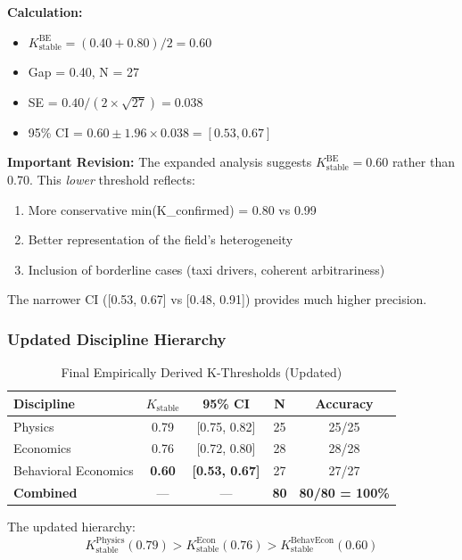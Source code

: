 \documentclass[11pt,a4paper]{article}
\begin{document}
\textbf{Calculation:}
\begin{itemize}
    \item $K_{\text{stable}}^{\text{BE}} = (0.40 + 0.80) / 2 = 0.60$
    \item Gap = 0.40, N = 27
    \item SE = $0.40 / (2 \times \sqrt{27}) = 0.038$
    \item 95\% CI = $0.60 \pm 1.96 \times 0.038 = [0.53, 0.67]$
\end{itemize}

\begin{warningbox}
\textbf{Important Revision:} The expanded analysis suggests $K_{\text{stable}}^{\text{BE}} = 0.60$ rather than 0.70. This \textit{lower} threshold reflects:
\begin{enumerate}
    \item More conservative min(K\_confirmed) = 0.80 vs 0.99
    \item Better representation of the field's heterogeneity
    \item Inclusion of borderline cases (taxi drivers, coherent arbitrariness)
\end{enumerate}
The narrower CI ([0.53, 0.67] vs [0.48, 0.91]) provides much higher precision.
\end{warningbox}

\subsubsection{Updated Discipline Hierarchy}

\begin{table}[h]
\centering
\caption{Final Empirically Derived K-Thresholds (Updated)}
\begin{tabular}{lcccc}
\toprule
\textbf{Discipline} & $K_{\text{stable}}$ & \textbf{95\% CI} & \textbf{N} & \textbf{Accuracy} \\
\midrule
Physics & 0.79 & [0.75, 0.82] & 25 & 25/25 \\
Economics & 0.76 & [0.72, 0.80] & 28 & 28/28 \\
Behavioral Economics & \textbf{0.60} & \textbf{[0.53, 0.67]} & 27 & 27/27 \\
\midrule
\textbf{Combined} & --- & --- & \textbf{80} & \textbf{80/80 = 100\%} \\
\bottomrule
\end{tabular}
\end{table}

The updated hierarchy:
\[
K_{\text{stable}}^{\text{Physics}} (0.79) > K_{\text{stable}}^{\text{Econ}} (0.76) > K_{\text{stable}}^{\text{BehavEcon}} (0.60)
\]
\end{document}
